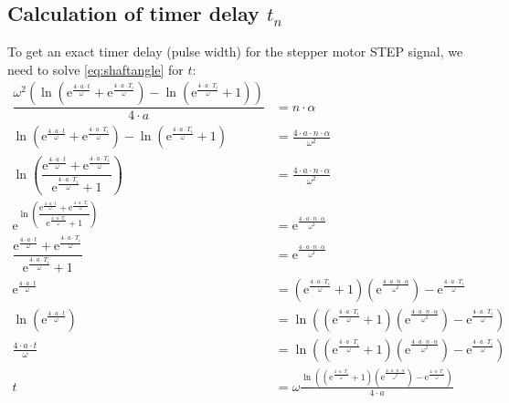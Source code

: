 \documentclass[hidelinks, 11pt, fleqn]{article}   	%
\begin{document}
\subsection{Calculation of timer delay $t_{n}$}
To get an exact timer delay (pulse width) for the stepper motor STEP signal, we need to solve \eqref{eq:shaftangle} for $t$:
\begin{align*}
\dfrac{\omega^2\left(\ln\left(\mathrm{e}^\frac{4 \cdot a \cdot t}{\omega}+\mathrm{e}^\frac{4 \cdot a \cdot T_{i}}{\omega}\right)-\ln\left(\mathrm{e}^\frac{4 \cdot a \cdot T_{i}}{\omega}+1\right)\right)}{4 \cdot a} &= n \cdot \alpha & \\
\ln\left(\mathrm{e}^\frac{4 \cdot a \cdot t}{\omega}+\mathrm{e}^\frac{4 \cdot a \cdot T_{i}}{\omega}\right)-\ln\left(\mathrm{e}^\frac{4 \cdot a \cdot T_{i}}{\omega}+1\right) &= \frac{4 \cdot a \cdot n \cdot \alpha}{\omega^2} & \\
\ln\left(\dfrac{\mathrm{e}^\frac{4 \cdot a \cdot t}{\omega}+\mathrm{e}^\frac{4 \cdot a \cdot T_{i}}{\omega}}{\mathrm{e}^\frac{4 \cdot a \cdot T_{i}}{\omega}+1}\right) &= \frac{4 \cdot a \cdot n \cdot \alpha}{\omega^2} & \\
\mathrm{e}^{\ln\left(\dfrac{\mathrm{e}^\frac{4 \cdot a \cdot t}{\omega}+\mathrm{e}^\frac{4 \cdot a \cdot T_{i}}{\omega}}{\mathrm{e}^\frac{4 \cdot a \cdot T_{i}}{\omega}+1}\right)} &= \mathrm{e}^{\frac{4 \cdot a \cdot n \cdot \alpha}{\omega^2}} & \\
\dfrac{\mathrm{e}^\frac{4 \cdot a \cdot t}{\omega}+\mathrm{e}^\frac{4 \cdot a \cdot T_{i}}{\omega}}{\mathrm{e}^\frac{4 \cdot a \cdot T_{i}}{\omega}+1} &= \mathrm{e}^{\frac{4 \cdot a \cdot n \cdot \alpha}{\omega^2}} & \\
\mathrm{e}^\frac{4 \cdot a \cdot t}{\omega} &= \left(\mathrm{e}^\frac{4 \cdot a \cdot T_{i}}{\omega}+1\right) \left(\mathrm{e}^{\frac{4 \cdot a \cdot n \cdot \alpha}{\omega^2}}\right) - \mathrm{e}^\frac{4 \cdot a \cdot T_{i}}{\omega} & \\
\ln\left(\mathrm{e}^\frac{4 \cdot a \cdot t}{\omega}\right) &= \ln\left(\left(\mathrm{e}^\frac{4 \cdot a \cdot T_{i}}{\omega}+1\right) \left(\mathrm{e}^{\frac{4 \cdot a \cdot n \cdot \alpha}{\omega^2}}\right) - \mathrm{e}^\frac{4 \cdot a \cdot T_{i}}{\omega}\right) & \\
\frac{4 \cdot a \cdot t}{\omega} &= \ln\left(\left(\mathrm{e}^\frac{4 \cdot a \cdot T_{i}}{\omega}+1\right) \left(\mathrm{e}^{\frac{4 \cdot a \cdot n \cdot \alpha}{\omega^2}}\right) - \mathrm{e}^\frac{4 \cdot a \cdot T_{i}}{\omega}\right) & \\
t &= \omega \frac{\ln\left(\left(\mathrm{e}^\frac{4 \cdot a \cdot T_{i}}{\omega}+1\right) \left(\mathrm{e}^{\frac{4 \cdot a \cdot n \cdot \alpha}{\omega^2}}\right) - \mathrm{e}^\frac{4 \cdot a \cdot T_{i}}{\omega}\right)}{4 \cdot a}
\end{align*}
\end{document}
